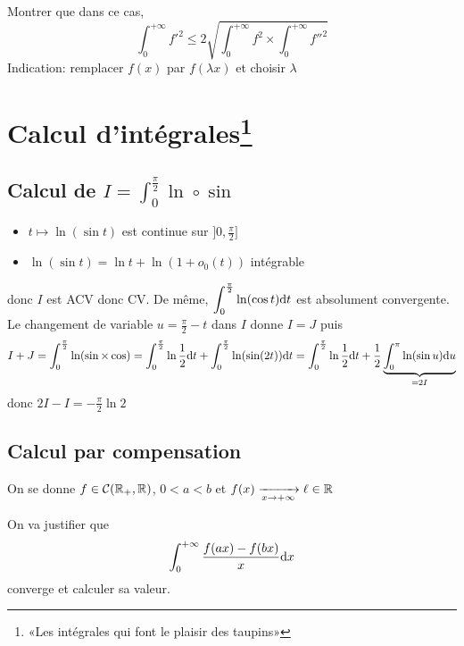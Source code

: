 \begin{exo}
    Montrer que dans ce cas, \[
        \int_0^{+\infty}f'^2\leq 2\sqrt{\int_0^{+\infty}f^2\times \int_0^{+\infty}f''^2}
    \]
    Indication: remplacer $f(x)$ par $f(\lambda x)$ et choisir $\lambda$
\end{exo}

\section{Calcul d'intégrales\texorpdfstring{\footnote{«Les intégrales qui font le plaisir des taupins»}}{}}

\subsection{Calcul de $I=\int_0^{\frac\pi2}\ln\circ \sin$}

\begin{itemize}
    \item $t\longmapsto \ln(\sin t)$ est continue sur $]0, \frac\pi2]$
    \item $\ln(\sin t)=\ln t+\ln(1+o_0(t))$ intégrable
\end{itemize}
donc $I$ est ACV donc CV. De même, $\displaystyle\int_0^{\frac\pi2}\ln(\cos t)\mathrm{d} t$ est absolument convergente. Le changement de variable $u=\frac\pi2-t$ dans $I$ donne $I=J$ puis \[
    I+J=\int_0^{\frac\pi2}\ln(\sin\times \cos)=\int_0^{\frac\pi2}\ln\frac12\mathrm{d} t+\int_0^{\frac\pi2}\ln(\sin(2t))\mathrm{d} t=\int_0^{\frac\pi2}\ln\frac12\mathrm{d} t+\frac12\underbrace{\int_0^\pi\ln(\sin u)\mathrm{d} u}_{=2I}
\]
donc $2I-I=-\frac\pi2\ln2$

\subsection{Calcul par compensation}

On se donne $f\in\mathcal C(\mathbb R_+, \mathbb R)$, $0<a<b$ et $f(x)\xrightarrow[x\to+\infty]{}\ell\in\mathbb R$

On va justifier que \[
    \int_0^{+\infty}\frac{f(ax)-f(bx)}x\mathrm{d} x
\]
converge et calculer sa valeur.

